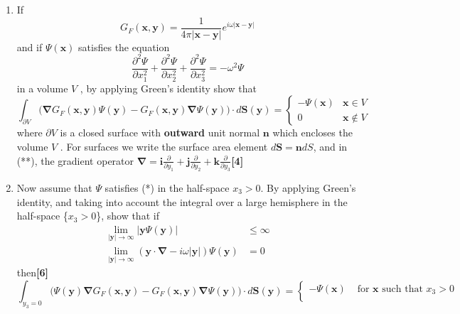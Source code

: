 \documentclass[a4paper]{article}
\begin{document}
\begin{qns}\leavevmode
\begin{enumerate}[label=(\roman*)]
    \item If
$$G_F(\mathbf{x},\mathbf{y})=\frac{1}{4\pi|\mathbf{x}-\mathbf{y}|}e^{i\omega|\mathbf{x}-\mathbf{y}|}$$
and if $\Psi(\mathbf{x})$ satisfies the equation
\begin{equation}
  \frac{\partial^2\Psi}{\partial x_1^2}+\frac{\partial^2\Psi}{\partial x_2^2}+\frac{\partial^2\Psi}{\partial x_3^2}=-\omega^2\Psi\tag{*}  
\end{equation}
in a volume $V$ , by applying Green’s identity show that
\begin{equation}
    \int_{\partial V}\bigg(\boldsymbol{\nabla}G_F(\mathbf{x},\mathbf{y})\Psi(\mathbf{y})-G_F(\mathbf{x},\mathbf{y})\boldsymbol{\nabla}\Psi(\mathbf{y})\bigg)\cdot d\mathbf{S}(\mathbf{y})=
\left\{
        \begin{array}{ll}
      -\Psi(\mathbf{x}) & \mathbf{x}\in V \\
      0 & \mathbf{x}\notin V
        \end{array}
    \right.\tag{**}
\end{equation}
where $\partial V$ is a closed surface with \textbf{outward} unit normal $\mathbf{n}$ which encloses the volume $V$ . For surfaces we write the surface area element $d\mathbf{S} = \mathbf{n}dS$, and in (**), the gradient
operator $\boldsymbol{\nabla}=\mathbf{i}\frac{\partial}{\partial y_1}+\mathbf{j}\frac{\partial}{\partial y_2}+\mathbf{k}\frac{\partial}{\partial y_3}$\hfill\textbf{[4]}
\item Now assume that $\Psi$ satisfies (*) in the half-space {$x_3 > 0$}. By applying Green’s identity, and taking into account the integral over a large hemisphere in the half-space \{$x_3 > 0$\}, show that if
\begin{align}
    \lim_{|\mathbf{y}|\rightarrow\infty}|\mathbf{y}\Psi(\mathbf{y})|&\leq\infty\nonumber\\
    \lim_{|\mathbf{y}|\rightarrow\infty}(\mathbf{y}\cdot\boldsymbol{\nabla}-i\omega|\mathbf{y}|)\Psi(\mathbf{y})&=0\nonumber
    \tag{\dag}
\end{align}
then\hfill\textbf{[6]}
$$\int_{y_3=0}\bigg(\Psi(\mathbf{y})\boldsymbol{\nabla}G_F(\mathbf{x},\mathbf{y})-G_F(\mathbf{x},\mathbf{y})\boldsymbol{\nabla}\Psi(\mathbf{y})\bigg)\cdot d\mathbf{S}(\mathbf{y})=
\left\{
        \begin{array}{ll}
      -\Psi(\mathbf{x}) & \text{ for }\mathbf{x}\text{ such that }x_3>0 \\

\end{array}$$
\end{enumerate}
\end{qns}
\end{document}
